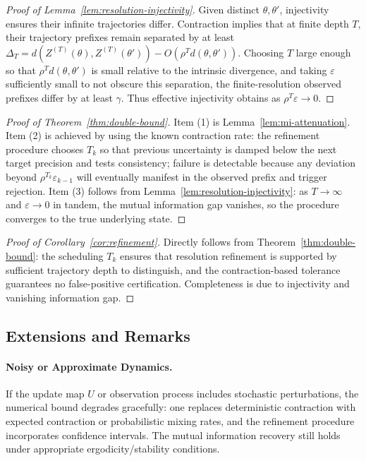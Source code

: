 \documentclass[12pt]{article}
\theoremstyle{definition}
\theoremstyle{plain}
\begin{document}
\begin{proof}[Proof of Lemma~\ref{lem:resolution-injectivity}]
Given distinct \(\theta,\theta'\), injectivity ensures their infinite trajectories differ. Contraction implies that at finite depth \(T\), their trajectory prefixes remain separated by at least \(\Delta_T = d(Z^{(T)}(\theta), Z^{(T)}(\theta')) - O(\rho^T d(\theta,\theta'))\). Choosing \(T\) large enough so that \(\rho^T d(\theta,\theta')\) is small relative to the intrinsic divergence, and taking \(\varepsilon\) sufficiently small to not obscure this separation, the finite-resolution observed prefixes differ by at least \(\gamma\). Thus effective injectivity obtains as \(\rho^T\varepsilon\to 0\).
\end{proof}

\begin{proof}[Proof of Theorem~\ref{thm:double-bound}]
Item (1) is Lemma~\ref{lem:mi-attenuation}. Item (2) is achieved by using the known contraction rate: the refinement procedure chooses \(T_k\) so that previous uncertainty is damped below the next target precision and tests consistency; failure is detectable because any deviation beyond \(\rho^{T_k}\varepsilon_{k-1}\) will eventually manifest in the observed prefix and trigger rejection. Item (3) follows from Lemma~\ref{lem:resolution-injectivity}: as \(T\to\infty\) and \(\varepsilon\to 0\) in tandem, the mutual information gap vanishes, so the procedure converges to the true underlying state.  
\end{proof}

\begin{proof}[Proof of Corollary~\ref{cor:refinement}]
Directly follows from Theorem~\ref{thm:double-bound}: the scheduling \(T_k\) ensures that resolution refinement is supported by sufficient trajectory depth to distinguish, and the contraction-based tolerance guarantees no false-positive certification. Completeness is due to injectivity and vanishing information gap.
\end{proof}

\subsection{Extensions and Remarks}

\paragraph{Noisy or Approximate Dynamics.} If the update map \(U\) or observation process includes stochastic perturbations, the numerical bound degrades gracefully: one replaces deterministic contraction with expected contraction or probabilistic mixing rates, and the refinement procedure incorporates confidence intervals. The mutual information recovery still holds under appropriate ergodicity/stability conditions.
\end{document}
